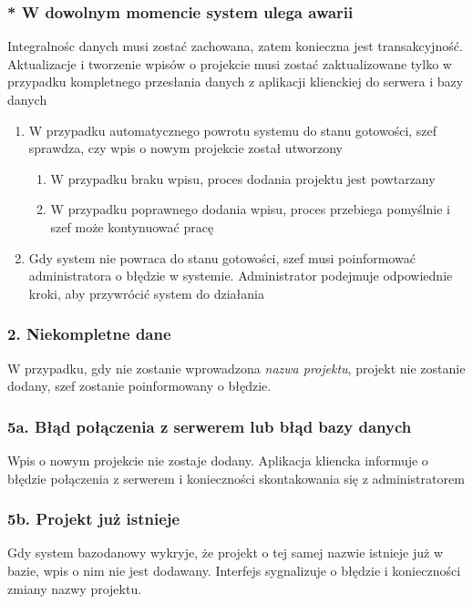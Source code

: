 \documentclass{article}
\begin{document}
\begin{tcolorbox}
    \subsubsection*{* W dowolnym momencie system ulega awarii}
    Integralnośc danych musi zostać zachowana, zatem konieczna jest transakcyjność. Aktualizacje
    i tworzenie wpisów o projekcie musi zostać zaktualizowane tylko w przypadku kompletnego przesłania
    danych z aplikacji klienckiej do serwera i bazy danych
    \begin{enumerate}
        \item W przypadku automatycznego powrotu systemu do stanu gotowości, szef sprawdza, czy wpis o nowym projekcie został utworzony
              \begin{enumerate}
                  \item W przypadku braku wpisu, proces dodania projektu jest powtarzany
                  \item W przypadku poprawnego dodania wpisu, proces przebiega pomyślnie i szef może kontynuować pracę
              \end{enumerate}
        \item Gdy system nie powraca do stanu gotowości, szef musi poinformować administratora o błędzie w systemie. Administrator podejmuje odpowiednie kroki, aby przywrócić system do działania
    \end{enumerate}

    \subsubsection*{2. Niekompletne dane}
    W przypadku, gdy nie zostanie wprowadzona \textit{nazwa projektu}, projekt nie zostanie dodany, szef zostanie poinformowany o błędzie.

    \subsubsection*{5a. Błąd połączenia z serwerem lub błąd bazy danych}
    Wpis o nowym projekcie nie zostaje dodany. Aplikacja kliencka informuje o błędzie połączenia z serwerem i konieczności skontakowania się z administratorem


    \subsubsection*{5b. Projekt już istnieje}
    Gdy system bazodanowy wykryje, że projekt o tej samej nazwie istnieje już w bazie, wpis o nim nie jest dodawany. Interfejs sygnalizuje o błędzie i konieczności zmiany nazwy projektu.


\end{tcolorbox}
\end{document}
